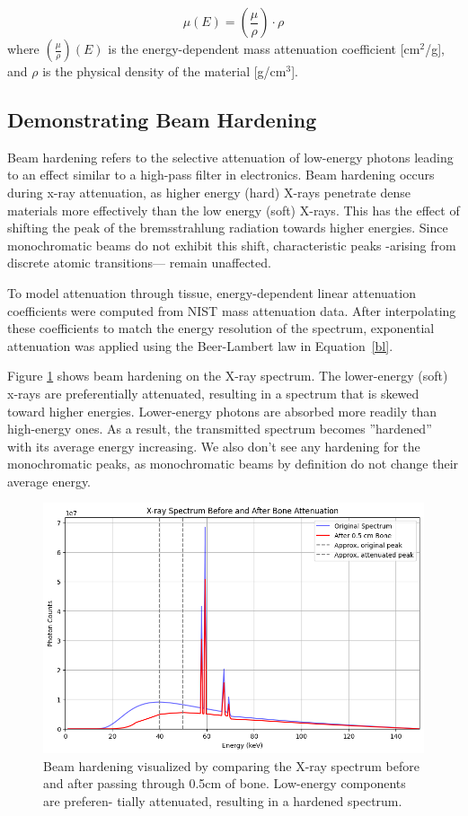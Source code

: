 \documentclass{article}
\theoremstyle{definition}
\begin{document}
\begin{equation} \label{linearatt}
\mu(E) = \left(\frac{\mu}{\rho}\right) \cdot \rho
\end{equation}
where $\left(\frac{\mu}{\rho}\right)(E)$ is the energy-dependent mass attenuation coefficient [cm$^2$/g], and $\rho$ is the physical density of the material [g/cm$^3$].

\subsection{Demonstrating Beam Hardening}
Beam hardening refers to the selective attenuation of low-energy photons leading to an effect similar to a high-pass filter in electronics. Beam hardening occurs during x-ray attenuation, as higher energy (hard) X-rays penetrate dense materials more effectively than the low energy (soft) X-rays. This has the effect of shifting the peak of the bremsstrahlung radiation towards higher energies. Since monochromatic beams do not exhibit this shift, characteristic peaks -arising from discrete atomic transitions— remain unaffected.

To model attenuation through  tissue, energy-dependent linear attenuation coefficients were computed from NIST mass attenuation data. After interpolating these coefficients to match the energy resolution of the spectrum, exponential attenuation was applied using the Beer-Lambert law in Equation~\ref{bl}.

Figure \ref{fig:beamhardening} shows beam hardening on the X-ray spectrum. The lower-energy (soft) x-rays are preferentially attenuated, resulting in a spectrum that is skewed toward higher energies. Lower-energy photons are absorbed more readily than high-energy ones. As a result, the transmitted spectrum becomes ”hardened” with its average energy increasing. We also don’t see any hardening for the monochromatic peaks, as monochromatic beams by definition do not change their average energy.

\begin{figure}[H]
	\includegraphics[scale=0.6]{beamhardening.png}
	\caption{Beam hardening visualized by comparing the X-ray spectrum before
and after passing through 0.5cm of bone. Low-energy components are preferen-
tially attenuated, resulting in a hardened spectrum.}
  \label{fig:beamhardening}
\end{figure}
\end{document}
